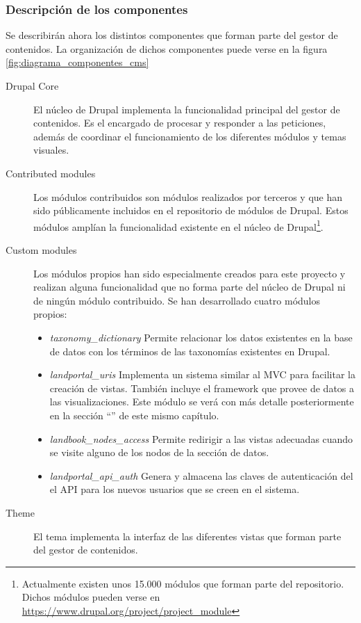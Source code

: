 \subsubsection{Descripción de los componentes}
Se describirán ahora los distintos componentes que forman parte del gestor de contenidos. La organización de dichos componentes puede verse en la figura \ref{fig:diagrama_componentes_cms}
\begin{description}
	\item[Drupal Core]  El núcleo de Drupal implementa la funcionalidad principal del gestor de contenidos.  Es el encargado de procesar y responder a las peticiones, además de coordinar el funcionamiento de los diferentes módulos y temas visuales.
	\item[Contributed modules]  Los módulos contribuidos son módulos realizados por terceros y que han sido públicamente incluidos en el repositorio de módulos de Drupal.  Estos módulos amplían la funcionalidad existente en el núcleo de Drupal\footnote{Actualmente existen unos 15.000 módulos que forman parte del repositorio.  Dichos módulos pueden verse en \url{https://www.drupal.org/project/project_module}}.
	\item[Custom modules]  Los módulos propios han sido especialmente creados para este proyecto y realizan alguna funcionalidad que no forma parte del núcleo de Drupal ni de ningún módulo contribuido.  Se han desarrollado cuatro módulos propios:
		\begin{itemize}
			\item \textit{taxonomy\_dictionary}  Permite relacionar los datos existentes en la base de datos con los términos de las taxonomías existentes en Drupal.
			\item \textit{landportal\_uris}  Implementa un sistema similar al MVC para facilitar la creación de vistas.  También incluye el framework que provee de datos a las visualizaciones.  Este módulo se verá con más detalle posteriormente en la sección ``'' de este mismo capítulo.
			\item \textit{landbook\_nodes\_access}  Permite redirigir a las vistas adecuadas cuando se visite alguno de los nodos de la sección de datos.
			\item \textit{landportal\_api\_auth}  Genera y almacena las claves de autenticación del el API para los nuevos usuarios que se creen en el sistema.
		\end{itemize}
	\item[Theme]  El tema implementa la interfaz de las diferentes vistas que forman parte del gestor de contenidos.
\end{description}


